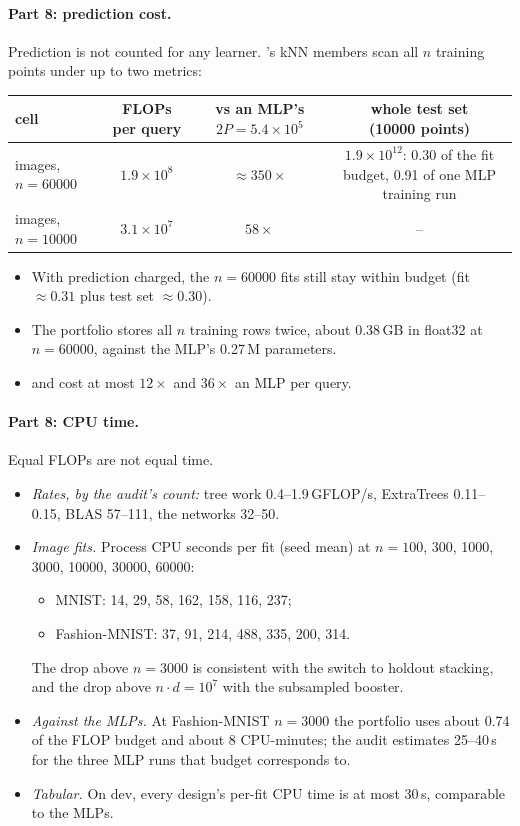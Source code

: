 \paragraph{Part 8: prediction cost.} Prediction is not counted for any learner. 's kNN members scan all $n$ training points under up to two metrics:
\begin{center}\footnotesize
\begin{tabular}{lccc}
\toprule
cell & FLOPs per query & \hd{vs an MLP's\\$2P=5.4\times10^5$} & \hd{whole test set\\(10000 points)}\\
\midrule
images, $n=60000$ & $1.9\times10^8$ & $\approx350\times$ & \hd{$1.9\times10^{12}$: 0.30 of the fit budget,\\0.91 of one MLP training run}\\
images, $n=10000$ & $3.1\times10^7$ & $58\times$ & --\\
\bottomrule
\end{tabular}
\end{center}
\begin{itemize}
\item With prediction charged, the $n=60000$ fits still stay within budget (fit $\approx0.31$ plus test set $\approx0.30$).
\item The portfolio stores all $n$ training rows twice, about 0.38\,GB in float32 at $n=60000$, against the MLP's 0.27\,M parameters.
\item {} and  cost at most $12\times$ and $36\times$ an MLP per query.
\end{itemize}

\paragraph{Part 8: CPU time.} Equal FLOPs are not equal time.
\begin{itemize}
\item \emph{Rates, by the audit's count:} tree work 0.4--1.9\,GFLOP/s, ExtraTrees 0.11--0.15, BLAS 57--111, the networks 32--50.
\item \emph{Image fits.} Process CPU seconds per  fit (seed mean) at $n=100$, 300, 1000, 3000, 10000, 30000, 60000:
  \begin{itemize}
  \item MNIST: 14, 29, 58, 162, 158, 116, 237;
  \item Fashion-MNIST: 37, 91, 214, 488, 335, 200, 314.
  \end{itemize}
  The drop above $n=3000$ is consistent with the switch to holdout stacking, and the drop above $n\cdot d=10^7$ with the subsampled booster.
\item \emph{Against the MLPs.} At Fashion-MNIST $n=3000$ the portfolio uses about 0.74 of the FLOP budget and about 8 CPU-minutes; the audit estimates 25--40\,s for the three MLP runs that budget corresponds to.
\item \emph{Tabular.} On dev, every design's per-fit CPU time is at most 30\,s, comparable to the MLPs.
\end{itemize}
